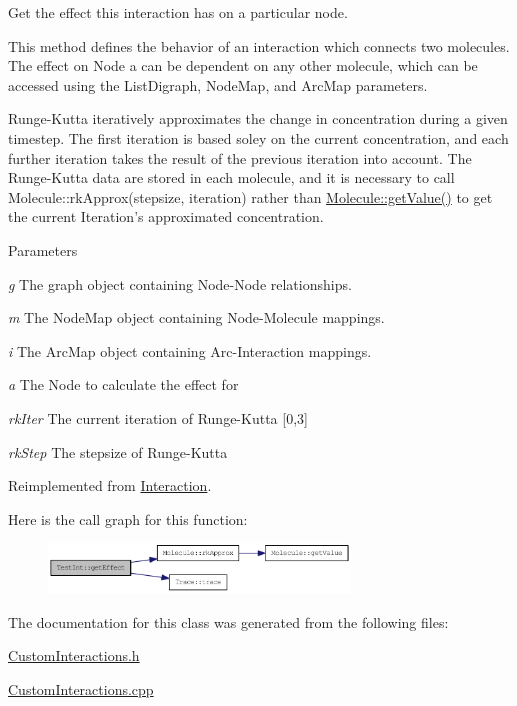Get the effect this interaction has on a particular node.

This method defines the behavior of an interaction which connects two molecules. The effect on Node a can be dependent on any other molecule, which can be accessed using the ListDigraph, NodeMap, and ArcMap parameters.

Runge-\/Kutta iteratively approximates the change in concentration during a given timestep. The first iteration is based soley on the current concentration, and each further iteration takes the result of the previous iteration into account. The Runge-\/Kutta data are stored in each molecule, and it is necessary to call Molecule::rkApprox(stepsize, iteration) rather than \hyperlink{classMolecule_a554ea822918374775d5f52b5d49d8195}{Molecule::getValue()} to get the current Iteration's approximated concentration.


\begin{DoxyParams}{Parameters}
\item[{\em g}]The graph object containing Node-\/Node relationships. \item[{\em m}]The NodeMap object containing Node-\/Molecule mappings. \item[{\em i}]The ArcMap object containing Arc-\/Interaction mappings. \item[{\em a}]The Node to calculate the effect for \item[{\em rkIter}]The current iteration of Runge-\/Kutta \mbox{[}0,3\mbox{]} \item[{\em rkStep}]The stepsize of Runge-\/Kutta \end{DoxyParams}


Reimplemented from \hyperlink{classInteraction_a6328831e714adf9c8177f6052d2e017f}{Interaction}.

Here is the call graph for this function:\nopagebreak
\begin{figure}[H]
\begin{center}
\leavevmode
\includegraphics[width=227pt]{classTestInt_a7e6d8e60a2ebc357052a7776244893d7_cgraph}
\end{center}
\end{figure}


The documentation for this class was generated from the following files:\begin{DoxyCompactItemize}
\item 
\hyperlink{CustomInteractions_8h}{CustomInteractions.h}\item 
\hyperlink{CustomInteractions_8cpp}{CustomInteractions.cpp}\end{DoxyCompactItemize}
